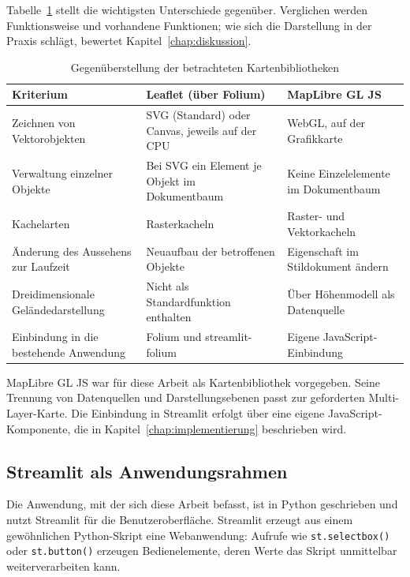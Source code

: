 \documentclass[12pt,a4paper]{report}
\begin{document}
Tabelle~\ref{tab:bibliotheken} stellt die wichtigsten Unterschiede gegenüber. Verglichen
werden Funktionsweise und vorhandene Funktionen; wie sich die Darstellung in der Praxis
schlägt, bewertet Kapitel~\ref{chap:diskussion}.

\begin{table}[htbp]
\centering
\caption{Gegenüberstellung der betrachteten Kartenbibliotheken}
\label{tab:bibliotheken}
\small
\begin{tabular}{p{3.8cm} p{4.6cm} p{4.6cm}}
\toprule
\textbf{Kriterium} & \textbf{Leaflet (über Folium)} & \textbf{MapLibre GL JS} \\
\midrule
Zeichnen von Vektorobjekten
  & SVG (Standard) oder Canvas, jeweils auf der CPU
  & WebGL, auf der Grafikkarte \\
\addlinespace
Verwaltung einzelner Objekte
  & Bei SVG ein Element je Objekt im Dokumentbaum
  & Keine Einzelelemente im Dokumentbaum \\
\addlinespace
Kachelarten
  & Rasterkacheln
  & Raster- und Vektorkacheln \\
\addlinespace
Änderung des Aussehens zur Laufzeit
  & Neuaufbau der betroffenen Objekte
  & Eigenschaft im Stildokument ändern \\
\addlinespace
Dreidimensionale Geländedarstellung
  & Nicht als Standardfunktion enthalten
  & Über Höhenmodell als Datenquelle \\
\addlinespace
Einbindung in die bestehende Anwendung
  & Folium und streamlit-folium
  & Eigene JavaScript-Einbindung \\
\bottomrule
\end{tabular}
\end{table}

MapLibre GL JS war für diese Arbeit als Kartenbibliothek vorgegeben. Seine Trennung
von Datenquellen und Darstellungsebenen passt zur geforderten Multi-Layer-Karte.
Die Einbindung in Streamlit erfolgt über eine eigene JavaScript-Komponente,
die in Kapitel~\ref{chap:implementierung} beschrieben wird.

\subsection{Streamlit als Anwendungsrahmen}
\label{subsec:streamlit}

Die Anwendung, mit der sich diese Arbeit befasst, ist in Python geschrieben und nutzt Streamlit für die Benutzeroberfläche. Streamlit erzeugt aus einem gewöhnlichen Python-Skript eine
Webanwendung: Aufrufe wie \texttt{st.selectbox()} oder \texttt{st.button()} erzeugen
Bedienelemente, deren Werte das Skript unmittelbar weiterverarbeiten kann.
\end{document}
